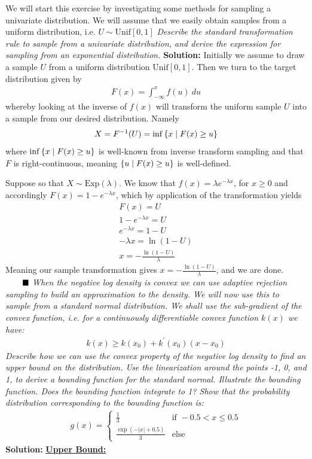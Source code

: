 We will start this exercise by investigating some
methods for sampling a univariate distribution. We will assume that we easily obtain samples
from a uniform distribution, i.e. $U \sim \text{Unif}[0,1]$
\emph{Describe the standard transformation rule to sample from a univariate distribution, and
derive the expression for sampling from an exponential distribution.} \spaze 
\textbf{Solution:} \spaze
Initially we assume to draw a sample $U$ from a uniform distribution $\text{Unif}[0,1]$. Then we turn to the target distribution given by 
\begin{align*}
    F(x) = \int_{-\infty}^{x} f(u) \ du
\end{align*}
whereby looking at the inverse of $f(x)$ will transform the uniform sample $U$ into a sample from our desired distribution. Namely 
\begin{align*}
    X = F^{-1}(U) = \inf \left\{ x \mid F(x) \geq u \right\}
\end{align*}
where $\inf \left\{ x \mid F(x) \geq u \right\}$ is well-known from inverse transform sampling and that $F$ is right-continuous, meaning $\left\{ u \mid F(x) \geq u \right\}$ is well-defined. 

Suppose so that $X \sim \text{Exp}(\lambda)$. We know that $f(x) = \lambda e^{-\lambda x}$, for $x \geq 0 $ and accordingly $F(x) = 1 - e^{-\lambda x}$, which by application of the transformation yields 
\begin{align*}
F(x) = U \\[5pt]
1 - e^{-\lambda x} = U \\[5pt] 
e^{-\lambda x} = 1 - U  \\[5pt]
-\lambda x = \ln(1 - U) \\[5pt]
x = -\frac{\ln(1 - U)}{\lambda} 
\end{align*}
Meaning our sample transformation gives $\boxed{x = -\frac{\ln(1 - U)}{\lambda}}$, and we are done. $\Q$
\emph{When the negative log density is convex we can use adaptive rejection sampling to build an
approximation to the density. We will now use this to sample from a standard normal
distribution. We shall use the sub-gradient of the convex function, i.e. for a continuously
differentiable convex function $k(x)$ we have:} 
\begin{align*}
    k(x) \geq k(x_0) + k^{\prime}(x_0)(x - x_0)
\end{align*}
\emph{Describe how we can use the convex property of the negative log density to find an
upper bound on the distribution. Use the linearization around the points -1, 0, and 1,
to derive a bounding function for the standard normal. Illustrate the bounding function.
Does the bounding function integrate to 1? Show that the probability distribution
corresponding to the bounding function is:} 
\begin{align}
g(x) = 
\begin{cases}
    \frac{1}{3} & \text{if } -0.5 < x \leq 0.5 \\[5pt]
    \frac{\exp(-|x| + 0.5)}{3} & \text{else}
\end{cases} \label{eq:prop_exer_1}
\end{align}
\textbf{Solution:} \spaze 
\underline{\textbf{Upper Bound:}}

